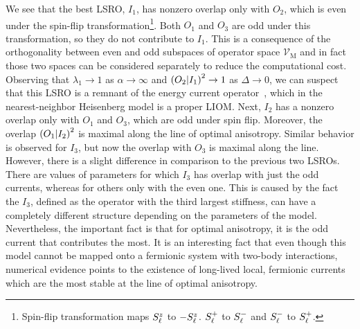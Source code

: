 We see that the best LSRO, \(I_1\), has nonzero overlap only with \(O_2\), which is even under the
spin-flip transformation\footnote{Spin-flip transformation maps \(S^{z}_{\ell}\) to \(-S^{z}_{\ell}\).
\(S^{+}_{\ell}\) to \(S^{-}_{\ell}\) and \(S^{-}_{\ell}\) to \(S^{+}_{\ell}\).}.
Both \(O_1\) and \(O_3\) are odd under this transformation, so they do not contribute to \(I_1\).
This is a consequence of the orthogonality between even and odd subspaces of operator space \(\mathcal{V}_{\textrm{M}}\)
and in fact those two spaces can be considered separately to reduce the computational cost.
Observing that \(\lambda_1 \to 1\) as \(\alpha \to \infty\) and \(\left(O_2 \middle| I_1\right)^2 \to 1\) as
\(\Delta\to 0\), we can suspect that this LSRO is a remnant of the energy current operator~\autocite{Zotos1997},
which in the nearest-neighbor Heisenberg model is a proper LIOM.
Next, \(I_2\) has a nonzero overlap only with \(O_1\) and \(O_3\), which are odd under spin flip.
Moreover, the overlap \(\left(O_1 \middle| I_2\right)^2\) is maximal along the line of optimal anisotropy.
Similar behavior is observed for \(I_3\), but now the overlap with \(O_3\) is maximal along the
line. However, there is a slight difference in comparison to the previous two LSROs. There are
values of parameters for which \(I_3\) has overlap with just the odd currents, whereas for others
only with the even one. This is caused by the fact the \(I_3\), defined as the operator with
the third largest stiffness, can have a completely different structure depending on the parameters of 
the model. Nevertheless, the important fact is that for optimal anisotropy, it is the odd
current that contributes the most. It is an interesting fact that even though this model cannot be mapped
onto a fermionic system with two-body interactions, numerical evidence points to the existence of long-lived
local, fermionic currents which are the most stable at the line of optimal anisotropy.

